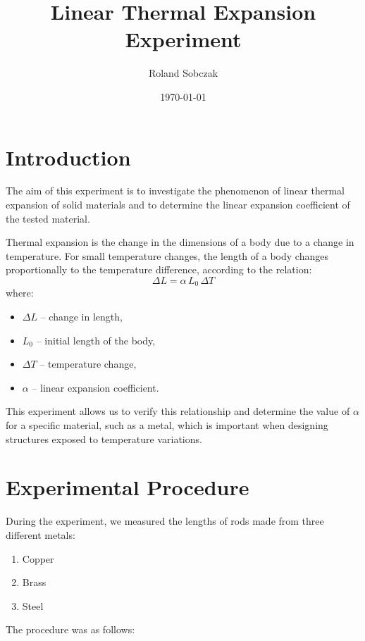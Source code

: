 \documentclass[a4paper,12pt]{article} %
\title{Linear Thermal Expansion Experiment} %
\author{Roland Sobczak}
\date{\today} %
\begin{document}
\maketitle %

\section{Introduction}

The aim of this experiment is to investigate the phenomenon of linear thermal expansion of solid materials and to determine the linear expansion coefficient of the tested material.

Thermal expansion is the change in the dimensions of a body due to a change in temperature. For small temperature changes, the length of a body changes proportionally to the temperature difference, according to the relation:
\begin{equation}
    \Delta L = \alpha \, L_0 \, \Delta T
\end{equation}
where:
\begin{itemize}
    \item $\Delta L$ – change in length,
    \item $L_0$ – initial length of the body,
    \item $\Delta T$ – temperature change,
    \item $\alpha$ – linear expansion coefficient.
\end{itemize}

This experiment allows us to verify this relationship and determine the value of $\alpha$ for a specific material, such as a metal, which is important when designing structures exposed to temperature variations.

\section{Experimental Procedure}

During the experiment, we measured the lengths of rods made from three different metals:
\begin{enumerate}
    \item Copper
    \item Brass
    \item Steel
\end{enumerate}

The procedure was as follows:
\end{document}
